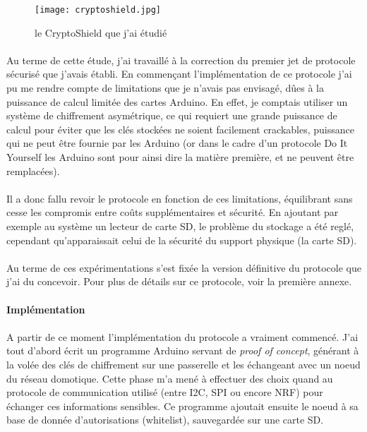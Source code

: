 \documentclass[12 pt]{report}
\begin{document}
\begin{figure}[h]
\center
\texttt{[image: cryptoshield.jpg]}
\caption{le CryptoShield que j'ai étudié}
\end{figure}
\paragraph{}Au terme de cette étude, j'ai travaillé à la correction du premier jet de protocole sécurisé que j'avais établi. En commençant l'implémentation de ce protocole j'ai pu me rendre compte de limitations que je n'avais pas envisagé, dûes à la puissance de calcul limitée des cartes Arduino. En effet, je comptais utiliser un système de chiffrement asymétrique, ce qui requiert une grande puissance de calcul pour éviter que les clés stockées ne soient facilement crackables, puissance qui ne peut être fournie par les Arduino (or dans le cadre d'un protocole Do It Yourself les Arduino sont pour ainsi dire la matière première, et ne peuvent être remplacées). \paragraph{}Il a donc fallu revoir le protocole en fonction de ces limitations, équilibrant sans cesse les compromis entre coûts supplémentaires et sécurité. En ajoutant par exemple au système un lecteur de carte SD, le problème du stockage a été reglé, cependant qu'apparaissait celui de la sécurité du support physique (la carte SD).
\paragraph{}Au terme de ces expérimentations s'est fixée la version définitive du protocole que j'ai du concevoir. Pour plus de détails sur ce protocole, voir la première annexe.



\newpage{}
\paragraph{Implémentation}
\paragraph{}A partir de ce moment l'implémentation du protocole a vraiment commencé. J'ai tout d'abord écrit un programme Arduino servant de \emph{proof of concept}, générant à la volée des clés de chiffrement sur une passerelle et les échangeant avec un noeud du réseau domotique. Cette phase m'a mené à effectuer des choix quand au protocole de communication utilisé (entre I2C, SPI ou encore NRF) pour échanger ces informations sensibles. Ce programme ajoutait ensuite le noeud à sa base de donnée d'autorisations (whitelist), sauvegardée sur une carte SD.
\end{document}
